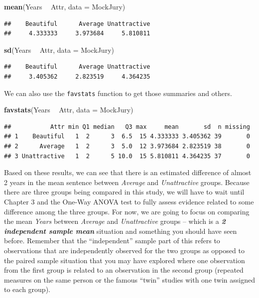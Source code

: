 \documentclass[]{book}
\newenvironment{Shaded}{\begin{snugshade}}{\end{snugshade}}
\newcommand{\KeywordTok}[1]{\textcolor[rgb]{0.13,0.29,0.53}{\textbf{#1}}}
\newcommand{\DataTypeTok}[1]{\textcolor[rgb]{0.13,0.29,0.53}{#1}}
\newcommand{\StringTok}[1]{\textcolor[rgb]{0.31,0.60,0.02}{#1}}
\newcommand{\OperatorTok}[1]{\textcolor[rgb]{0.81,0.36,0.00}{\textbf{#1}}}
\newcommand{\NormalTok}[1]{#1}
\begin{document}
\begin{Shaded}
\begin{Highlighting}[]
\KeywordTok{mean}\NormalTok{(Years }\OperatorTok{~}\StringTok{ }\NormalTok{Attr, }\DataTypeTok{data =}\NormalTok{ MockJury)}
\end{Highlighting}
\end{Shaded}

\begin{verbatim}
##    Beautiful      Average Unattractive 
##     4.333333     3.973684     5.810811
\end{verbatim}

\begin{Shaded}
\begin{Highlighting}[]
\KeywordTok{sd}\NormalTok{(Years }\OperatorTok{~}\StringTok{ }\NormalTok{Attr, }\DataTypeTok{data =}\NormalTok{ MockJury)}
\end{Highlighting}
\end{Shaded}

\begin{verbatim}
##    Beautiful      Average Unattractive 
##     3.405362     2.823519     4.364235
\end{verbatim}

We can also use the \texttt{favstats} function to get those summaries
and others.

\begin{Shaded}
\begin{Highlighting}[]
\KeywordTok{favstats}\NormalTok{(Years }\OperatorTok{~}\StringTok{ }\NormalTok{Attr, }\DataTypeTok{data =}\NormalTok{ MockJury)}
\end{Highlighting}
\end{Shaded}

\begin{verbatim}
##           Attr min Q1 median   Q3 max     mean       sd  n missing
## 1    Beautiful   1  2      3  6.5  15 4.333333 3.405362 39       0
## 2      Average   1  2      3  5.0  12 3.973684 2.823519 38       0
## 3 Unattractive   1  2      5 10.0  15 5.810811 4.364235 37       0
\end{verbatim}

Based on these results, we can see that there is an estimated difference
of almost 2 years in the mean sentence between \emph{Average} and
\emph{Unattractive} groups. Because there are three groups being
compared in this study, we will have to wait until Chapter 3 and the
One-Way ANOVA test to fully assess evidence related to some difference
among the three groups. For now, we are going to focus on comparing the
mean \emph{Years} between \emph{Average} and \emph{Unattractive} groups
-- which is a \textbf{\emph{2 independent sample mean}} situation and
something you should have seen before. Remember that the ``independent''
sample part of this refers to observations that are independently
observed for the two groups as opposed to the paired sample situation
that you may have explored where one observation from the first group is
related to an observation in the second group (repeated measures on the
same person or the famous ``twin'' studies with one twin assigned to
each group).
\end{document}
